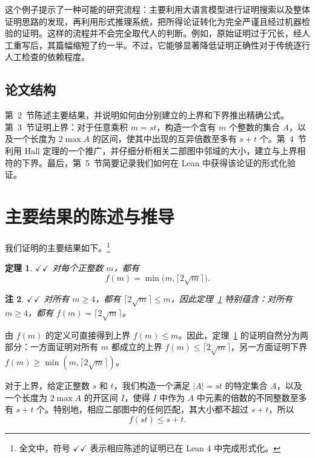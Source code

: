 \documentclass[UTF8,a4paper,oneside,openany,fontset=fandol,zihao=-4]{ctexbook}
\theoremstyle{chinesestyle}
\newtheorem{theorem}{定理}[section]
\newtheorem{remark}[theorem]{注}
\newcommand{\leanmark}{\ensuremath{\checkmark\!\checkmark}}
\begin{document}
这个例子提示了一种可能的研究流程：主要利用大语言模型进行证明搜索以及整体证明思路的发现，再利用形式推理系统，把所得论证转化为完全严谨且经过机器检验的证明。这样的流程并不会完全取代人的判断。例如，原始证明过于冗长，经人工重写后，其篇幅缩短了约一半。不过，它能够显著降低证明正确性对于传统逐行人工检查的依赖程度。

\subsection{论文结构}

第~2~节陈述主要结果，并说明如何由分别建立的上界和下界推出精确公式。第~3~节证明上界：对于任意乘积 $m=st$，构造一个含有 $m$ 个整数的集合 $A$，以及一个长度为 $2\max A$ 的区间，使其中出现的互异倍数至多有 $s+t$ 个。第~4~节利用 Hall 定理的一个推广，并仔细分析相关二部图中邻域的大小，建立与上界相符的下界。最后，第~5~节简要记录我们如何在 Lean 中获得该论证的形式化验证。

\section{主要结果的陈述与推导}\label{sec:main-result}

我们证明的主要结果如下。\footnote{全文中，符号 \leanmark{} 表示相应陈述的证明已在 Lean 4 中完成形式化。}

\begin{theorem}\label{thm:exact}
\leanmark{} 对每个正整数 $m$，都有
\[
f(m)=\min\bigl(m,\lceil 2\sqrt m\rceil\bigr).
\]
\end{theorem}

\begin{remark}\label{rem:ge4}
\leanmark{} 对所有 $m\geq 4$，都有 $\lceil 2\sqrt m\rceil\leq m$，因此定理~\ref{thm:exact} 特别蕴含：对所有 $m\geq 4$，都有 $f(m)=\lceil 2\sqrt m\rceil$。
\end{remark}

由 $f(m)$ 的定义可直接得到上界 $f(m)\leq m$。因此，定理~\ref{thm:exact} 的证明自然分为两部分：一方面证明对所有 $m$ 都成立的上界 $f(m)\leq\lceil 2\sqrt m\rceil$，另一方面证明下界 $f(m)\geq\min(m,\lceil 2\sqrt m\rceil)$。

对于上界，给定正整数 $s$ 和 $t$，我们构造一个满足 $|A|=st$ 的特定集合 $A$，以及一个长度为 $2\max A$ 的开区间 $I$，使得 $I$ 中作为 $A$ 中元素的倍数的不同整数至多有 $s+t$ 个。特别地，相应二部图中的任何匹配，其大小都不超过 $s+t$，所以
\begin{equation}
f(st)\leq s+t.\tag{1}\label{eq:product}
\end{equation}
\end{document}
